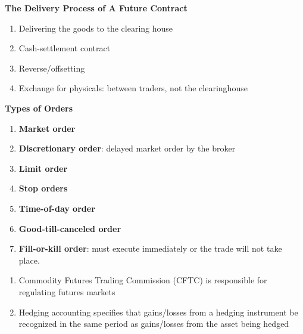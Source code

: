 \documentclass[11pt,fleqn]{report} %
\numberwithin{equation}{section} %
\numberwithin{figure}{section} %
\numberwithin{table}{section} %
\begin{document}
\begin{definition}
\textbf{The Delivery Process of A Future Contract}
\begin{enumerate}
    \item Delivering the goods to the clearing house
    \item Cash-settlement contract
    \item Reverse/offsetting
    \item Exchange for physicals: between traders, not the clearinghouse
\end{enumerate}
\end{definition}
\begin{definition}\textbf{Types of Orders}
\begin{enumerate}
    \item \textbf{Market order}
    \item \textbf{Discretionary order}: delayed market order by the broker
    \item \textbf{Limit order}
    \item \textbf{Stop orders}
    \item \textbf{Time-of-day order}
    \item \textbf{Good-till-canceled order}
    \item \textbf{Fill-or-kill order}: must execute immediately or the trade will not take place.
\end{enumerate}
\end{definition}
\begin{remark}
\begin{enumerate}
    \item Commodity Futures Trading Commission (CFTC) is responsible for regulating futures markets
    \item Hedging accounting specifies that gains/losses from a hedging instrument be recognized in the same period as gains/losses from the asset being hedged
\end{enumerate}
\end{remark}
\end{document}

